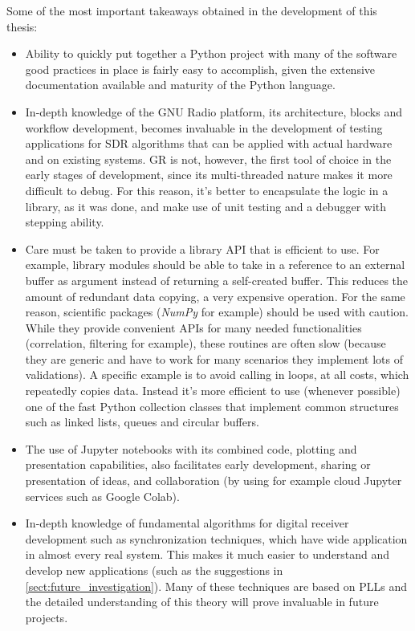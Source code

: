 Some of the most important takeaways obtained in the development of this thesis:
\begin{itemize}
  \item Ability to quickly put together a Python project with many of the software good practices in place is fairly easy to accomplish, given the extensive documentation available and maturity of the Python language.
  \item In-depth knowledge of the GNU Radio platform, its architecture, blocks and workflow development, becomes invaluable in the development of testing applications for SDR algorithms that can be applied with actual hardware and on existing systems. GR is not, however, the first tool of choice in the early stages of development, since its multi-threaded nature makes it more difficult to debug. For this reason, it's better to encapsulate the logic in a library, as it was done, and make use of unit testing and a debugger with stepping ability.
  \item Care must be taken to provide a library API that is efficient to use. For example, library modules should be able to take in a reference to an external buffer as argument instead of returning a self-created buffer. This reduces the amount of redundant data copying, a very expensive operation. For the same reason, scientific packages (\emph{NumPy} for example) should be used with caution. While they provide convenient APIs for many needed functionalities (correlation, filtering for example), these routines are often slow (because they are generic and have to work for many scenarios they implement lots of validations). A specific example is to avoid calling  in loops, at all costs, which repeatedly copies data. Instead it's more efficient to use (whenever possible) one of the fast Python collection classes that implement common structures such as linked lists, queues and circular buffers.
  \item The use of Jupyter notebooks with its combined code, plotting and presentation capabilities, also facilitates early development, sharing or presentation of ideas, and collaboration (by using for example cloud Jupyter services such as Google Colab).
  \item In-depth knowledge of fundamental algorithms for digital receiver development such as synchronization techniques, which have wide application in almost every real system. This makes it much easier to understand and develop new applications (such as the suggestions in \autoref{sect:future_investigation}). Many of these techniques are based on PLLs and the detailed understanding of this theory will prove invaluable in future projects.

\end{itemize}
